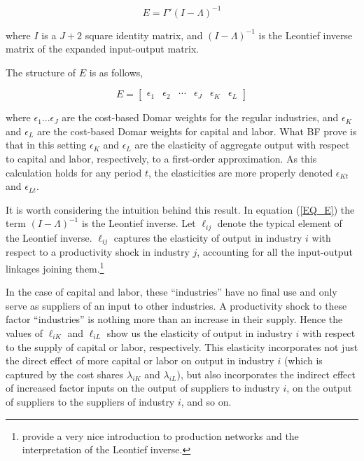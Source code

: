 \documentclass[11pt]{article}
\begin{document}
\begin{equation}
	E = \Gamma' (I - \Lambda)^{-1} \label{EQ_E}
\end{equation}

where $I$ is a $J+2$ square identity matrix, and $(I - \Lambda)^{-1}$ is the Leontief inverse matrix of the expanded input-output matrix. 

The structure of $E$ is as follows,

\begin{equation}
	E = 
	\begin{bmatrix}
		\epsilon_1 &
		\epsilon_2 &
		\cdots &
		\epsilon_J &
		\epsilon_K &
		\epsilon_L
	\end{bmatrix}
\end{equation}

where $\epsilon_1 ... \epsilon_J$ are the cost-based Domar weights for the regular industries, and $\epsilon_K$ and $\epsilon_L$ are the cost-based Domar weights for capital and labor. What BF prove is that in this setting $\epsilon_K$ and $\epsilon_L$ are the elasticity of aggregate output with respect to capital and labor, respectively, to a first-order approximation. As this calculation holds for any period $t$, the elasticities are more properly denoted $\epsilon_{Kt}$ and $\epsilon_{Lt}$.

It is worth considering the intuition behind this result. In equation (\ref{EQ_E}) the term $(I - \Lambda)^{-1}$ is the Leontief inverse. Let $\ell_{ij}$ denote the typical element of the Leontief inverse. $\ell_{ij}$ captures the elasticity of output in industry $i$ with respect to a productivity shock in industry $j$, accounting for all the input-output linkages joining them.\footnote{\cite{cts2018} provide a very nice introduction to production networks and the interpretation of the Leontief inverse.}

In the case of capital and labor, these ``industries'' have no final use and only serve as suppliers of an input to other industries. A productivity shock to these factor ``industries'' is nothing more than an increase in their supply. Hence the values of $\ell_{iK}$ and $\ell_{iL}$ show us the elasticity of output in industry $i$ with respect to the supply of capital or labor, respectively. This elasticity incorporates not just the direct effect of more capital or labor on output in industry $i$ (which is captured by the cost shares $\lambda_{iK}$ and $\lambda_{iL}$), but also incorporates the indirect effect of increased factor inputs on the output of suppliers to industry $i$, on the output of suppliers to the suppliers of industry $i$, and so on. 
\end{document}
